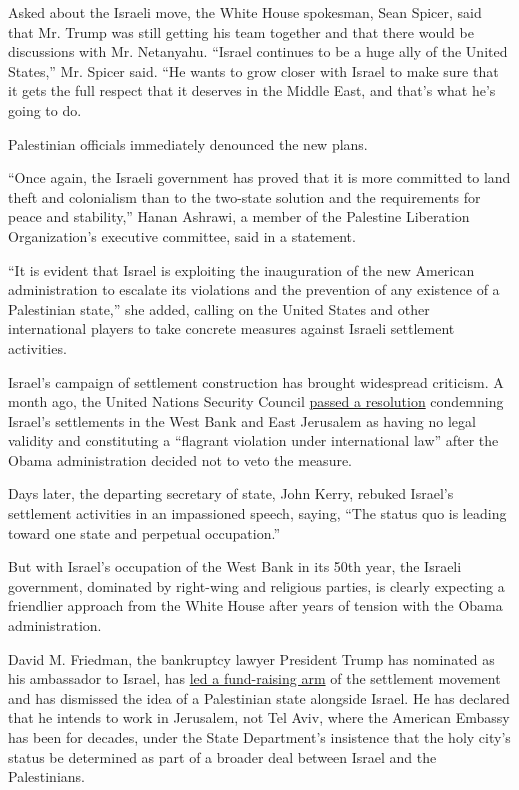 Asked about the Israeli move, the White House spokesman, Sean Spicer,
said that Mr. Trump was still getting his team together and that there
would be discussions with Mr. Netanyahu. ``Israel continues to be a huge
ally of the United States,'' Mr. Spicer said. ``He wants to grow closer
with Israel to make sure that it gets the full respect that it deserves
in the Middle East, and that's what he's going to do.

Palestinian officials immediately denounced the new plans.

``Once again, the Israeli government has proved that it is more
committed to land theft and colonialism than to the two-state solution
and the requirements for peace and stability,'' Hanan Ashrawi, a member
of the Palestine Liberation Organization's executive committee, said in
a statement.

``It is evident that Israel is exploiting the inauguration of the new
American administration to escalate its violations and the prevention of
any existence of a Palestinian state,'' she added, calling on the United
States and other international players to take concrete measures against
Israeli settlement activities.

Israel's campaign of settlement construction has brought widespread
criticism. A month ago, the United Nations Security Council
\href{https://www.nytimes3xbfgragh.onion/2016/12/23/world/middleeast/israel-settlements-un-vote.html?hp\&action=click\&pgtype=Homepage\&clickSource=story-heading\&module=first-column-region\&region=top-news\&WT.nav=top-news}{passed
a resolution} condemning Israel's settlements in the West Bank and East
Jerusalem as having no legal validity and constituting a ``flagrant
violation under international law'' after the Obama administration
decided not to veto the measure.

Days later, the departing secretary of state, John Kerry, rebuked
Israel's settlement activities in an impassioned speech, saying, ``The
status quo is leading toward one state and perpetual occupation.''

But with Israel's occupation of the West Bank in its 50th year, the
Israeli government, dominated by right-wing and religious parties, is
clearly expecting a friendlier approach from the White House after years
of tension with the Obama administration.

David M. Friedman, the bankruptcy lawyer President Trump has nominated
as his ambassador to Israel, has
\href{https://www.nytimes3xbfgragh.onion/2016/12/16/world/middleeast/david-friedman-us-ambassador-israel.html}{led
a fund-raising arm} of the settlement movement and has dismissed the
idea of a Palestinian state alongside Israel. He has declared that he
intends to work in Jerusalem, not Tel Aviv, where the American Embassy
has been for decades, under the State Department's insistence that the
holy city's status be determined as part of a broader deal between
Israel and the Palestinians.

